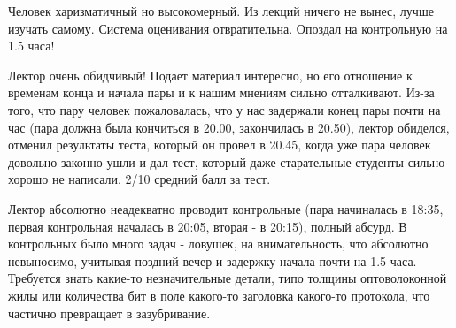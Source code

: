             \begin{commentbox} 
                Человек харизматичный но высокомерный. Из лекций ничего не вынес, лучше изучать самому. Система оценивания отвратительна. Опоздал на контрольную на 1.5 часа! 
            \end{commentbox} 
        
            \begin{commentbox} 
                Лектор очень обидчивый! Подает материал интересно, но его отношение к временам конца и начала пары и к нашим мнениям сильно отталкивают. Из-за того, что пару человек пожаловалась, что у нас задержали конец пары почти на час (пара должна была кончиться в 20.00, закончилась в 20.50), лектор обиделся, отменил результаты теста, который он провел в 20.45, когда уже пара человек довольно законно ушли и дал тест, который даже старательные студенты сильно хорошо не написали. 2/10 средний балл за тест. 
            \end{commentbox} 
        
            \begin{commentbox} 
                Лектор абсолютно неадекватно проводит контрольные (пара начиналась в 18:35, первая контрольная началась в 20:05, вторая - в 20:15), полный абсурд. В контрольных было много задач - ловушек, на внимательность, что абсолютно невыносимо, учитывая поздний вечер и задержку начала почти на 1.5 часа. Требуется знать какие-то незначительные детали, типо толщины оптоволоконной жилы или количества бит в поле какого-то заголовка какого-то протокола, что частично превращает в зазубривание. 
            \end{commentbox} 
        
